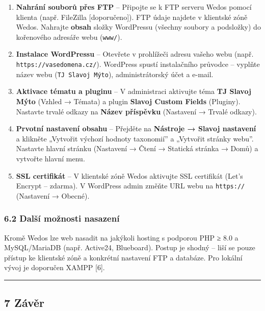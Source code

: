 \begin{enumerate}
  Vygenerujte bezpečnostní klíče na
  \href{https://api.wordpress.org/secret-key/1.1/salt/}{api.wordpress.org/secret-key}
  a vložte je do souboru.
\item
  \textbf{Nahrání souborů přes FTP} -- Připojte se k FTP serveru Wedos
  pomocí klienta (např. FileZilla {[}doporučeno{]}). FTP údaje najdete v
  klientské zóně Wedos. Nahrajte \textbf{obsah} složky WordPressu
  (všechny soubory a podsložky) do kořenového adresáře webu
  (\texttt{www/}).
\item
  \textbf{Instalace WordPressu} -- Otevřete v prohlížeči adresu vašeho
  webu (např. \texttt{https://vasedomena.cz/}). WordPress spustí
  instalačního průvodce -- vyplňte název webu
  (\texttt{TJ\ Slavoj\ Mýto}), administrátorský účet a e-mail.
\item
  \textbf{Aktivace tématu a pluginu} -- V administraci aktivujte téma
  \textbf{TJ Slavoj Mýto} (Vzhled → Témata) a plugin \textbf{Slavoj
  Custom Fields} (Pluginy). Nastavte trvalé odkazy na \textbf{Název
  příspěvku} (Nastavení → Trvalé odkazy).
\item
  \textbf{Prvotní nastavení obsahu} -- Přejděte na \textbf{Nástroje →
  Slavoj nastavení} a klikněte „Vytvořit výchozí hodnoty taxonomií'' a
  „Vytvořit stránky webu''. Nastavte hlavní stránku (Nastavení → Čtení →
  Statická stránka → Domů) a vytvořte hlavní menu.
\item
  \textbf{SSL certifikát} -- V klientské zóně Wedos aktivujte SSL
  certifikát (Let's Encrypt -- zdarma). V WordPress admin změňte URL
  webu na \texttt{https://} (Nastavení → Obecné).
\end{enumerate}

\subsubsection{6.2 Další možnosti
nasazení}\label{dalux161uxed-moux17enosti-nasazenuxed}

Kromě Wedos lze web nasadit na jakýkoli hosting s podporou PHP ≥ 8.0 a
MySQL/MariaDB (např. Active24, Blueboard). Postup je shodný -- liší se
pouze přístup ke klientské zóně a konkrétní nastavení FTP a databáze.
Pro lokální vývoj je doporučen XAMPP {[}6{]}.

\begin{center}\rule{0.5\linewidth}{0.5pt}\end{center}

\subsection{7 Závěr}\label{zuxe1vux11br}

